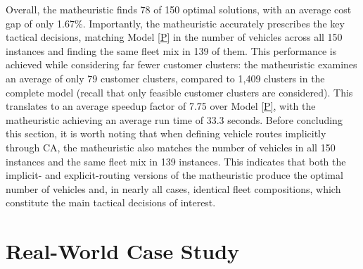 \documentclass[11pt]{elsarticle}
\theoremstyle{plain}
\newcommand{\blue}[1]{#1}
\begin{document}
Overall, the matheuristic finds 78 of 150 optimal solutions, with an average cost gap of only 1.67\%.
Importantly, the matheuristic accurately prescribes the key tactical decisions, matching Model \eqref{P} in the number of vehicles across all 150 instances and finding the same fleet mix in 139 of them.
This performance is achieved while considering far fewer customer clusters: the matheuristic examines an average of only 79 customer clusters, compared to 1,409 clusters in the complete model (recall that only feasible customer clusters are considered).
This translates to an average speedup factor of 7.75 over Model \eqref{P}, with the matheuristic achieving an average run time of 33.3 seconds. 
Before concluding this section, it is worth noting that when defining vehicle routes implicitly through \ac{CA}, the matheuristic also matches the number of vehicles in all 150 instances and the same fleet mix in 139 instances. This indicates that both the implicit- and explicit-routing versions of the matheuristic produce the optimal number of vehicles and, in nearly all cases, identical fleet compositions, which constitute the main tactical decisions of interest.

\begin{table}[htbp]
  \centering
  \caption{\blue{Average performance metrics of the matheuristic relative to the complete version of Model \eqref{P}, considering  \cite{henke2015multi}'s instances with 10 customers.}}
  \label{tab:optimal_comparison}%
\end{table}%


\section{Real-World Case Study} \label{sec:case_study}
\end{document}
